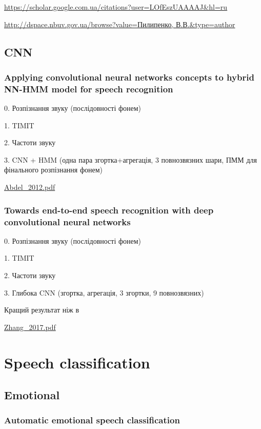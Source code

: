 \url{https://scholar.google.com.ua/citations?user=LOfEszUAAAAJ&hl=ru}

\url{http://dspace.nbuv.gov.ua/browse?value=Пилипенко, В.В.&type=author}

\section{CNN}

\subsection{Applying convolutional neural networks concepts to hybrid NN-HMM model for speech recognition}

0. Розпізнання звуку (послідовності фонем)

1. TIMIT

2. Частоти звуку

3. CNN + HMM (одна пара згортка+агрегація, 3 повнозвязних шари, ПММ для фінального розпізнання фонем)

\url{Abdel_2012.pdf}\cite{Abdel_2012}

\subsection{Towards end-to-end speech recognition with deep convolutional neural networks}

0. Розпізнання звуку (послідовності фонем)

1. TIMIT

2. Частоти звуку

3. Глибока CNN (згортка, агрегація, 3 згортки, 9 повнозвязних)

Кращий результат ніж в \cite{Abdel_2012}

\url{Zhang_2017.pdf}\cite{Zhang_2017}

\chapter{Speech classification}

\section{Emotional}

\subsection{Automatic emotional speech classification}

